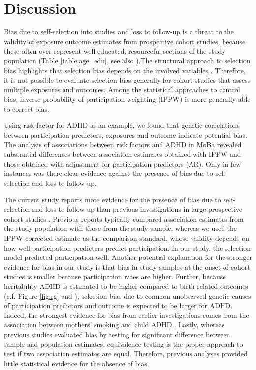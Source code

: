 \documentclass[12pt]{article}
\begin{document}
\section{Discussion}
Bias due to self-selection into studies and loss to follow-up is a threat to the validity of exposure outcome estimates from prospective cohort studies, because these often over-represent well educated, resourceful sections of the study population (Table \ref{table:age_edu}, see also \cite{Vinther-Larsen2010-hq, Galea2007-hv, Howe2013-vv}).The structural approach to selection bias highlights that selection bias depends on the involved variables \cite{Hernan2004-oz}. Therefore, it is not possible to evaluate selection bias generally for cohort studies that assess multiple exposures and outcomes. Among the statistical approaches to control bias, inverse probability of participation weighting (IPPW) is more generally able to correct bias\cite{Hernan2004-oz}.

Using risk factor for ADHD as an example, we found that genetic correlations between participation predictors, exposures and outcome indicate potential bias. The analysis of associations between risk factors and ADHD in MoBa revealed substantial differences between association estimates obtained with IPPW and those obtained with adjustment for participation predictors (AR). Only in few instances was there clear evidence against the presence of bias due to self-selection and loss to follow up.

The current study reports more evidence for the presence of bias due to self-selection and loss to follow up than previous investigations in large prospective cohort studies \cite{Nilsen2009-ci, Nohr2006-uf,Greene2011-am, Wolke2009-lu}. Previous reports typically compared association estimates from the study population with those from the study sample, whereas we used the IPPW corrected estimate as the comparison standard, whose validity depends on how well participation predictors predict participation\cite{Seaman2013-rj}. In our study, the selection model predicted participation well. Another potential explanation for the stronger evidence for bias in our study is that bias in study samples at the onset of cohort studies is smaller because participation rates are higher. Further, because heritability ADHD is estimated to be higher compared to birth-related outcomes (c.f. Figure \ref{fig:rg} and \cite{Wu2015-bg}), selection bias due to common unobserved genetic causes of participation predictors and outcome is expected to be larger for ADHD. Indeed, the strongest evidence for bias from earlier investigations comes from the association between mothers' smoking and child ADHD \cite{Greene2011-am}. Lastly, whereas previous studies evaluated bias by testing for significant difference between sample and population estimates, equivalence testing \cite{Schuirmann1987-ip, Mascha2011-um} is the proper approach to test if two association estimates are equal. Therefore, previous analyses provided little statistical evidence for the absence of bias. 
\end{document}
